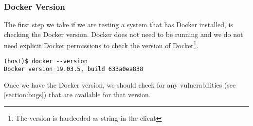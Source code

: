 \subsubsection{Docker Version}
The first step we take if we are testing a system that has Docker installed, is checking the Docker version. Docker does not need to be running and we do not need explicit Docker permissions to check the version of Docker\footnote{The version is hardcoded as string in the client}.

\begin{lstlisting}[caption={Show Docker version.},captionpos=b]
(host)$ docker --version
Docker version 19.03.5, build 633a0ea838
\end{lstlisting}

Once we have the Docker version, we should check for any vulnerabilities (see \autoref{section:bugs}) that are available for that version.
